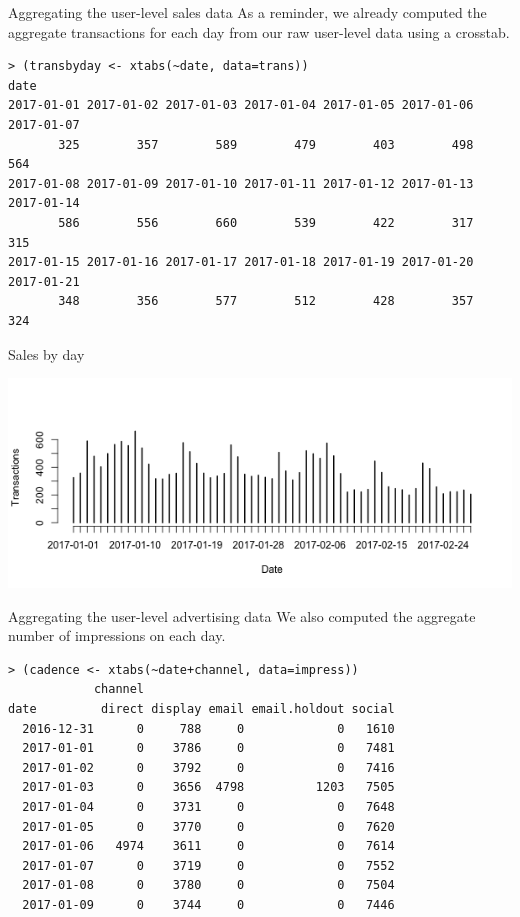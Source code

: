 \documentclass[10pt, aspectratio=169]{beamer}
\begin{document}
\begin{frame}[fragile]{Aggregating the user-level sales data}
As a reminder, we already computed the aggregate transactions for each day from our raw user-level data using a crosstab. 
\begin{lstlisting}
> (transbyday <- xtabs(~date, data=trans))
date
2017-01-01 2017-01-02 2017-01-03 2017-01-04 2017-01-05 2017-01-06 2017-01-07 
       325        357        589        479        403        498        564 
2017-01-08 2017-01-09 2017-01-10 2017-01-11 2017-01-12 2017-01-13 2017-01-14 
       586        556        660        539        422        317        315 
2017-01-15 2017-01-16 2017-01-17 2017-01-18 2017-01-19 2017-01-20 2017-01-21 
       348        356        577        512        428        357        324 
\end{lstlisting}
\end{frame} 

\begin{frame}{Sales by day}
\begin{center}
\includegraphics[width=\textwidth]{images/transbyday.png}
\end{center}
\end{frame}

\begin{frame}[fragile]{Aggregating the user-level advertising data}
We also computed the aggregate number of impressions on each day. 
\begin{lstlisting}
> (cadence <- xtabs(~date+channel, data=impress))
            channel
date         direct display email email.holdout social
  2016-12-31      0     788     0             0   1610
  2017-01-01      0    3786     0             0   7481
  2017-01-02      0    3792     0             0   7416
  2017-01-03      0    3656  4798          1203   7505
  2017-01-04      0    3731     0             0   7648
  2017-01-05      0    3770     0             0   7620
  2017-01-06   4974    3611     0             0   7614
  2017-01-07      0    3719     0             0   7552
  2017-01-08      0    3780     0             0   7504
  2017-01-09      0    3744     0             0   7446
\end{lstlisting}
\end{frame}
\end{document}
